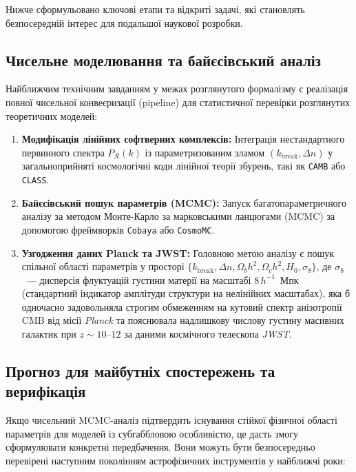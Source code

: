 \documentclass[12pt, a4paper]{article}
\begin{document}
Нижче сформульовано ключові етапи та відкриті задачі, які становлять безпосередній інтерес для подальшої наукової розробки.

\subsection{Чисельне моделювання та байєсівський аналіз}

Найближчим технічним завданням у межах розглянутого формалізму є реалізація повної чисельної конвеєризації (pipeline) для статистичної перевірки розглянутих теоретичних моделей:
\begin{enumerate}
  \item \textbf{Модифікація лінійних софтверних комплексів:} Інтеграція нестандартного первинного спектра $P_{\mathcal{R}}(k)$ із параметризованим зламом $(k_\mathrm{break}, \Delta n)$ у загальноприйняті космологічні коди лінійної теорії збурень, такі як \texttt{CAMB} або \texttt{CLASS}.
  \item \textbf{Байєсівський пошук параметрів (MCMC):} Запуск багатопараметричного аналізу за методом Монте-Карло за марковськими ланцюгами (MCMC) за допомогою фреймворків \texttt{Cobaya} або \texttt{CosmoMC}.
  \item \textbf{Узгодження даних Planck та JWST:} Головною метою аналізу є пошук спільної області параметрів у просторі $\{k_\mathrm{break}, \Delta n, \Omega_b h^2, \Omega_c h^2, H_0, \sigma_8\}$, де $\sigma_8$~--- дисперсія флуктуацій густини матерії на масштабі $8\,h^{-1}$~Мпк (стандартний індикатор амплітуди структури на нелінійних масштабах), яка б одночасно задовольняла строгим обмеженням на кутовий спектр анізотропії CMB від місії \emph{Planck} та пояснювала надлишкову числову густину масивних галактик при $z \sim 10$--$12$ за даними космічного телескопа \emph{JWST}.
\end{enumerate}

\subsection{Прогноз для майбутніх спостережень та верифікація}

Якщо чисельний MCMC-аналіз підтвердить існування стійкої фізичної області параметрів для моделей із субгаббловою особливістю, це дасть змогу сформулювати конкретні передбачення. Вони можуть бути безпосередньо перевірені наступним поколінням астрофізичних інструментів у найближчі роки:
\end{document}
